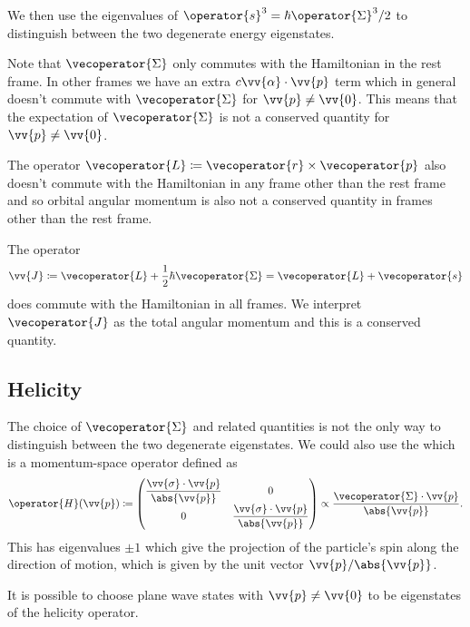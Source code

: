 \documentclass[fleqn]{NotesClass}
\newcommand*{\hamiltonian}{H}
\begin{document}
    We then use the eigenvalues of \(\operator{s}^3 = \hbar\operator{\Sigma}^3/2\) to distinguish between the two degenerate energy eigenstates.
    
    Note that \(\vecoperator{\Sigma}\) only commutes with the Hamiltonian in the rest frame.
    In other frames we have an extra \(c\vv{\alpha} \cdot \vv{p}\) term which in general doesn't commute with \(\vecoperator{\Sigma}\) for \(\vv{p} \ne \vv{0}\).
    This means that the expectation of \(\vecoperator{\Sigma}\) is not a conserved quantity for \(\vv{p} \ne \vv{0}\).
    
    The operator \(\vecoperator{L} \coloneqq \vecoperator{r}\times\vecoperator{p}\) also doesn't commute with the Hamiltonian in any frame other than the rest frame and so orbital angular momentum is also not a conserved quantity in frames other than the rest frame.
    
    The operator
    \begin{equation}
        \vv{J} \coloneqq \vecoperator{L} + \frac{1}{2}\hbar\vecoperator{\Sigma} = \vecoperator{L} + \vecoperator{s}
    \end{equation}
    does commute with the Hamiltonian in all frames.
    We interpret \(\vecoperator{J}\) as the total angular momentum and this is a conserved quantity.
    
    \subsection{Helicity}
    The choice of \(\vecoperator{\Sigma}\) and related quantities is not the only way to distinguish between the two degenerate eigenstates.
    We could also use the  which is a momentum-space operator defined as
    \begin{equation}
        \operator{\hamiltonian}(\vv{p}) \coloneqq
        \begin{pmatrix}
            \dfrac{\vv{\sigma}\cdot\vv{p}}{\abs{\vv{p}}} & 0\\
            0 & \dfrac{\vv{\sigma}\cdot\vv{p}}{\abs{\vv{p}}}
        \end{pmatrix}
        \propto \frac{\vecoperator{\Sigma} \cdot \vv{p}}{\abs{\vv{p}}}.
    \end{equation}
    This has eigenvalues \(\pm 1\) which give the projection of the particle's spin along the direction of motion, which is given by the unit vector \(\vv{p}/\abs{\vv{p}}\).
    
    It is possible to choose plane wave states with \(\vv{p} \ne \vv{0}\) to be eigenstates of the helicity operator.
    
\end{document}

